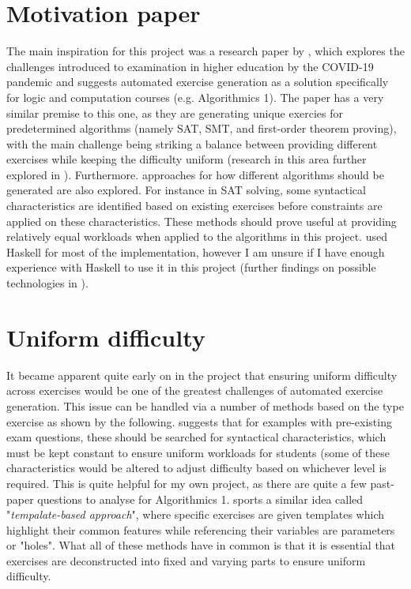 \documentclass{l4proj}
\begin{document}
\section{Motivation paper}
The main inspiration for this project was a research paper by \citet{Hoz21}, which explores the challenges introduced to examination in higher education by the COVID-19 pandemic and suggests  automated exercise generation as a solution specifically for logic and computation courses (e.g. Algorithmics 1). The paper has a very similar premise to this one, as they are generating unique exercies for predetermined algorithms (namely SAT, SMT, and first-order theorem proving), with the main challenge being striking a balance between providing different exercises while keeping the difficulty uniform (research in this area further explored in ). Furthermore. approaches for how different algorithms should be generated are also explored. For instance in SAT solving, some syntactical characteristics are identified based on existing exercises before constraints are applied on these characteristics. These methods should prove useful at providing relatively equal workloads when applied to the algorithms in this project. \citet{Hoz21} used Haskell for most of the implementation, however I am unsure if I have enough experience with Haskell to use it in this project (further findings on possible technologies in ). 
\section{Uniform difficulty}
\label{2.2}
It became apparent quite early on in the project that ensuring uniform difficulty across exercises would be one of the greatest challenges of automated exercise generation. This issue can be handled via a number of methods based on the type exercise as shown by the following. \citet{Hoz21} suggests that for examples with pre-existing exam questions, these should be searched for syntactical characteristics, which must be kept constant to ensure uniform workloads for students (some of these characteristics would be altered to adjust difficulty based on whichever level is required. This is quite helpful for my own project, as there are quite a few past-paper questions to analyse for Algorithmics 1. \citet{Sad12} sports a similar idea called  "\emph{tempalate-based approach}", where specific exercises are given templates which highlight their common features while referencing their variables are parameters or "holes". What all of these methods have in common is that it is essential that exercises are deconstructed into fixed and varying parts to ensure uniform difficulty.
\end{document}
